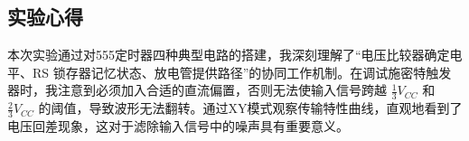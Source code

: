 \documentclass[10.5pt]{config}
\begin{document}
\subsection{实验心得}
本次实验通过对555定时器四种典型电路的搭建，我深刻理解了“电压比较器确定电平、RS 锁存器记忆状态、放电管提供路径”的协同工作机制。在调试施密特触发器时，我注意到必须加入合适的直流偏置，否则无法使输入信号跨越 $\frac{1}{3}V_{CC}$ 和 $\frac{2}{3}V_{CC}$ 的阈值，导致波形无法翻转。通过XY模式观察传输特性曲线，直观地看到了电压回差现象，这对于滤除输入信号中的噪声具有重要意义。
\end{document}
